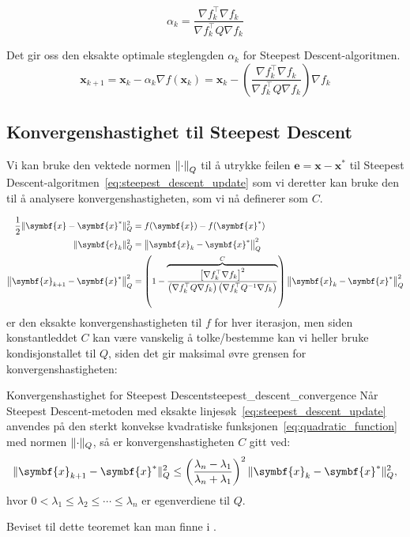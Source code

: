\[
	\alpha_k = \frac{\nabla f_k^\top \nabla f_k}{\nabla f_k^\top Q \nabla f_k}
\]

Det gir oss den eksakte optimale steglengden \(\alpha_k\) for Steepest Descent-algoritmen.
\begin{equation*}
	\symbf{x}_{k+1} = \symbf{x}_k - \alpha_k \nabla f(\symbf{x}_k) = \symbf{x}_k - \left(\frac{\nabla f_k^\top \nabla f_k}{\nabla f_k^\top Q \nabla f_k}\right) \nabla f_k
\end{equation*}\label{eq:steepest_descent_update}


\subsection{Konvergenshastighet til Steepest Descent}
Vi kan bruke den vektede normen $\norm*{\cdot}_Q$ til å utrykke feilen $\symbf{e} = \symbf{x} - \symbf{x}^\ast$ til Steepest Descent-algoritmen~\eqref{eq:steepest_descent_update} som vi deretter kan bruke den til å analysere konvergenshastigheten, som vi nå definerer som \(C\).

\begin{align*}
	\frac{1}{2} \norm{\symbf{x} - \symbf{x}^\ast}_Q^2 & = f(\symbf{x}) - f(\symbf{x}^\ast)                                                                                                                                                                                    \\
	\norm{\symbf{e}_k}_Q^2                            & = \norm*{\symbf{x}_k - \symbf{x}^\ast}_Q^2                                                                                                                                                                            \\
	\norm*{\symbf{x}_{k+1} - \symbf{x}^\ast}_Q^2      & = \left(1 - \overbrace{\frac{\left[\nabla f_k^\top \nabla f_k\right]^2}{\left(\nabla f_k^\top Q \nabla f_k\right)\left(\nabla f_k^\top Q^{-1} \nabla f_k\right)}}^{C}\right) \norm*{\symbf{x}_k - \symbf{x}^\ast}_Q^2
\end{align*}
er den eksakte konvergenshastigheten til $f$ for hver iterasjon, men siden konstantleddet \(C\) kan være vanskelig å tolke/bestemme kan vi heller bruke kondisjonstallet til \(Q\), siden det gir maksimal øvre grensen for konvergenshastigheten:

\begin{theorem}{Konvergenshastighet for Steepest Descent}{steepest_descent_convergence}
	Når Steepest Descent-metoden med eksakte linjesøk~\eqref{eq:steepest_descent_update} anvendes på den sterkt konvekse kvadratiske funksjonen~\eqref{eq:quadratic_function} med normen \(\norm{\cdot}_Q\), så er konvergenshastigheten \(C\) gitt ved:
	\[
		\norm{\symbf{x}_{k+1} - \symbf{x}^\ast}_Q^2 \leq \left(\frac{\lambda_n - \lambda_1}{\lambda_n + \lambda_1}\right)^2 \norm{\symbf{x}_k - \symbf{x}^\ast}_Q^2,
	\]
	hvor \(0 < \lambda_1 \leq \lambda_2 \leq \cdots \leq \lambda_n\) er egenverdiene til \(Q\).
\end{theorem}
Beviset til dette teoremet kan man finne i \cite{luenberger1984linear}.

